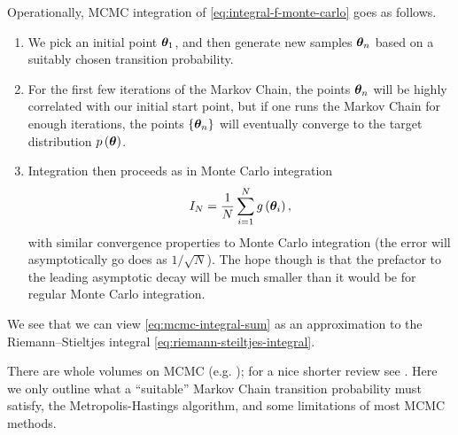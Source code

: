 Operationally, MCMC integration of \eqref{eq:integral-f-monte-carlo}
goes as follows.
\begin{enumerate}
    \item We pick an initial point ${\bm \theta}_1$, and then generate new samples
        ${\bm \theta}_n$ based on a suitably chosen transition probability.
    \item For the first few iterations of the Markov Chain, the points ${\bm \theta}_n$
        will be highly correlated with our initial start point, but if one runs the
        Markov Chain for enough iterations, the points $\{{\bm \theta}_n\}$ will eventually
        converge to the target distribution $p\left({\bm \theta}\right)$.
    \item Integration then proceeds as in Monte Carlo integration
        \begin{align}
            \label{eq:mcmc-integral-sum}
            I_N
            =
            \frac{1}{N}\sum_{i=1}^N g\left({\bm \theta}_i\right)
            ,
        \end{align}
        with similar convergence properties to Monte Carlo integration 
        (the error will asymptotically go does as $1/\sqrt{N}$).
        The hope though is that the prefactor to the leading asymptotic decay will be
        much smaller than it would be for regular Monte Carlo integration.
\end{enumerate}
We see that we can view \eqref{eq:mcmc-integral-sum} as an approximation to the
Riemann–Stieltjes integral \eqref{eq:riemann-steiltjes-integral}.

There are whole volumes on MCMC (e.g. \cite{brooks2011handbook}); 
for a nice shorter review see \cite{Hogg:2017akh}.
Here we only outline what a ``suitable'' Markov Chain transition probability
must satisfy, the Metropolis-Hastings algorithm, and some limitations
of most MCMC methods.

